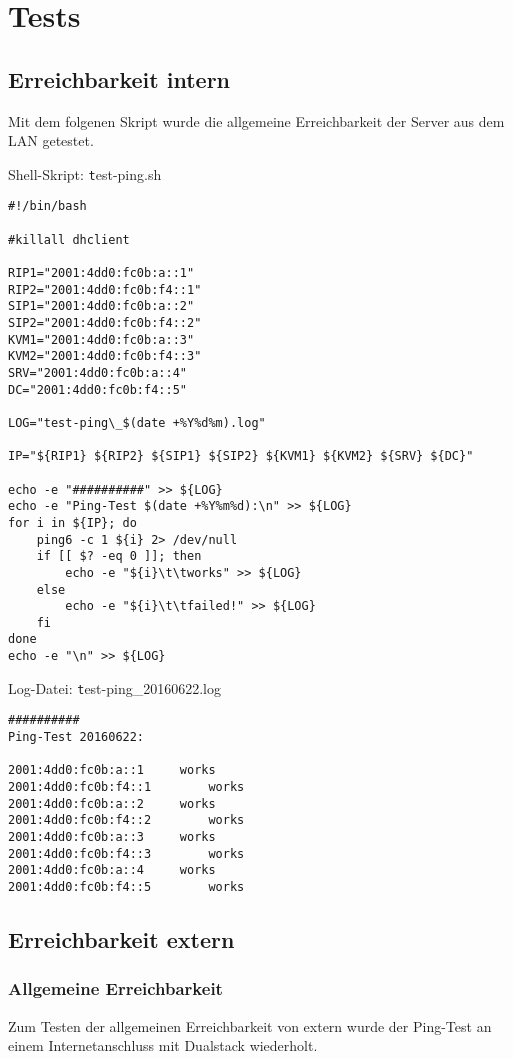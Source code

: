 \section{Tests}

\subsection{Erreichbarkeit intern}

Mit dem folgenen Skript wurde die allgemeine Erreichbarkeit der Server aus dem LAN getestet.

Shell-Skript: {\texttt test-ping.sh}
\begin{lstlisting}
#!/bin/bash

#killall dhclient

RIP1="2001:4dd0:fc0b:a::1"
RIP2="2001:4dd0:fc0b:f4::1"
SIP1="2001:4dd0:fc0b:a::2"
SIP2="2001:4dd0:fc0b:f4::2"
KVM1="2001:4dd0:fc0b:a::3"
KVM2="2001:4dd0:fc0b:f4::3"
SRV="2001:4dd0:fc0b:a::4"
DC="2001:4dd0:fc0b:f4::5"

LOG="test-ping\_$(date +%Y%d%m).log"

IP="${RIP1} ${RIP2} ${SIP1} ${SIP2} ${KVM1} ${KVM2} ${SRV} ${DC}"

echo -e "##########" >> ${LOG}
echo -e "Ping-Test $(date +%Y%m%d):\n" >> ${LOG}
for i in ${IP}; do
	ping6 -c 1 ${i} 2> /dev/null
	if [[ $? -eq 0 ]]; then
		echo -e "${i}\t\tworks" >> ${LOG}
	else
		echo -e "${i}\t\tfailed!" >> ${LOG}
	fi
done	
echo -e "\n" >> ${LOG}
\end{lstlisting}

Log-Datei: {\texttt test-ping\_20160622.log}
\begin{lstlisting}
##########
Ping-Test 20160622:

2001:4dd0:fc0b:a::1		works
2001:4dd0:fc0b:f4::1		works
2001:4dd0:fc0b:a::2		works
2001:4dd0:fc0b:f4::2		works
2001:4dd0:fc0b:a::3		works
2001:4dd0:fc0b:f4::3		works
2001:4dd0:fc0b:a::4		works
2001:4dd0:fc0b:f4::5		works
\end{lstlisting}

\subsection{Erreichbarkeit extern}

\subsubsection{Allgemeine Erreichbarkeit}

Zum Testen der allgemeinen Erreichbarkeit von extern wurde der Ping-Test an einem Internetanschluss mit Dualstack wiederholt.

